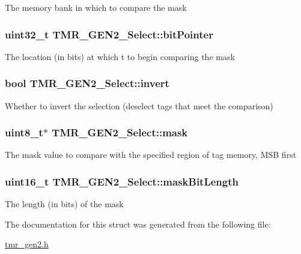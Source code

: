 The memory bank in which to compare the mask \hypertarget{struct_t_m_r___g_e_n2___select_b93b7d20d26ad74b14d1073010fb2eda}{
\subsubsection[{bitPointer}]{\setlength{\rightskip}{0pt plus 5cm}uint32\_\-t {\bf TMR\_\-GEN2\_\-Select::bitPointer}}}
\label{struct_t_m_r___g_e_n2___select_b93b7d20d26ad74b14d1073010fb2eda}


The location (in bits) at which t to begin comparing the mask \hypertarget{struct_t_m_r___g_e_n2___select_ec06bd3ddebe206414853d0a22cf8fef}{
\subsubsection[{invert}]{\setlength{\rightskip}{0pt plus 5cm}bool {\bf TMR\_\-GEN2\_\-Select::invert}}}
\label{struct_t_m_r___g_e_n2___select_ec06bd3ddebe206414853d0a22cf8fef}


Whether to invert the selection (deselect tags that meet the comparison) \hypertarget{struct_t_m_r___g_e_n2___select_68d1b14215398616426c2a86ac69c2ec}{
\subsubsection[{mask}]{\setlength{\rightskip}{0pt plus 5cm}uint8\_\-t$\ast$ {\bf TMR\_\-GEN2\_\-Select::mask}}}
\label{struct_t_m_r___g_e_n2___select_68d1b14215398616426c2a86ac69c2ec}


The mask value to compare with the specified region of tag memory, MSB first \hypertarget{struct_t_m_r___g_e_n2___select_05aa0e1e1e283c68f3ef53ddfc9c66b2}{
\subsubsection[{maskBitLength}]{\setlength{\rightskip}{0pt plus 5cm}uint16\_\-t {\bf TMR\_\-GEN2\_\-Select::maskBitLength}}}
\label{struct_t_m_r___g_e_n2___select_05aa0e1e1e283c68f3ef53ddfc9c66b2}


The length (in bits) of the mask 

The documentation for this struct was generated from the following file:\begin{CompactItemize}
\item 
\hyperlink{tmr__gen2_8h}{tmr\_\-gen2.h}\end{CompactItemize}
